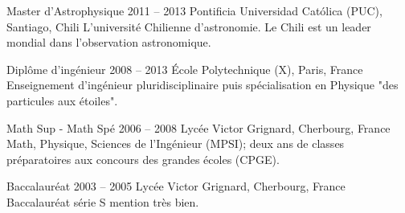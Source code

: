 



\begin{coordinatelist}
\end{coordinatelist}



\begin{yearlist}
\item[Master d'Astrophysique]{2011 -- 2013}
	{Pontificia Universidad Cat\'olica (PUC), Santiago, Chili}
    {L'université Chilienne d'astronomie. 
    Le Chili est un leader mondial dans l'observation astronomique.}


\item[Diplôme d'ingénieur]{2008 -- 2013}
	{\'Ecole Polytechnique (X), Paris, France}
    {Enseignement d'ingénieur pluridisciplinaire puis spécialisation en Physique 
    "des particules aux étoiles".}


\item[Math Sup - Math Spé]{2006 -- 2008}
	{Lyc\'ee Victor Grignard, Cherbourg, France}
	{Math, Physique, Sciences de l'Ingénieur (MPSI);
 	deux ans de classes préparatoires aux concours des grandes écoles (CPGE).}


\item[Baccalaur\'eat]{2003 -- 2005}
	{Lyc\'ee Victor Grignard, Cherbourg, France}
	{Baccalauréat série S mention très bien.}
\end{yearlist}



